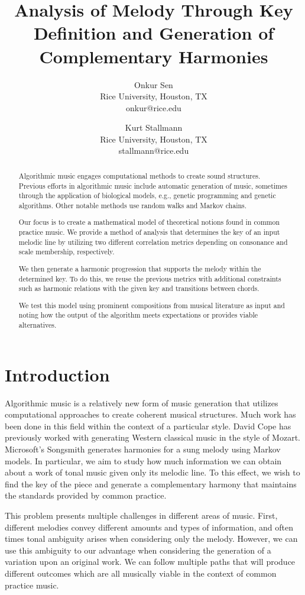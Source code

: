 \documentclass[11pt]{article}
\title{Analysis of Melody Through Key Definition and Generation of Complementary Harmonies}
\author{
Onkur Sen\\
Rice University, Houston, TX\\
onkur@rice.edu
\and
Kurt Stallmann\\
Rice University, Houston, TX\\
stallmann@rice.edu}
\date{}
\begin{document}
\maketitle

\begin{abstract}
Algorithmic music engages computational methods to create sound structures. Previous efforts in algorithmic music include automatic generation of music, sometimes through the application of biological models, e.g., genetic programming and genetic algorithms. Other notable methods use random walks and Markov chains.

Our focus is to create a mathematical model of theoretical notions found in common practice music. We provide a method of analysis that determines the key of an input melodic line by utilizing two different correlation metrics depending on consonance and scale membership, respectively. 

We then generate a harmonic progression that supports the melody within the determined key. To do this, we reuse the previous metrics with additional constraints such as harmonic relations with the given key and transitions between chords.

We test this model using prominent compositions from musical literature as input and noting how the output of the algorithm meets expectations or provides viable alternatives.
\end{abstract}

\section{Introduction}
Algorithmic music is a relatively new form of music generation that utilizes computational approaches to create coherent musical structures. Much work has been done in this field within the context of a particular style. David Cope has previously worked with generating Western classical music in the style of Mozart. Microsoft's Songsmith generates harmonies for a sung melody using Markov models. In particular, we aim to study how much information we can obtain about a work of tonal music given only its melodic line. To this effect, we wish to find the key of the piece and generate a complementary harmony that maintains the standards provided by common practice.

This problem presents multiple challenges in different areas of music. First, different melodies convey different amounts and types of information, and often times tonal ambiguity arises when considering only the melody. However, we can use this ambiguity to our advantage when considering the generation of a variation upon an original work. We can follow multiple paths that will produce different outcomes which are all musically viable in the context of common practice music.
\end{document}
